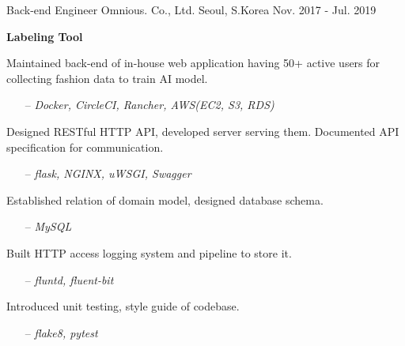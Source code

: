 

\begin{cventries}

  \cventry
    {Back-end Engineer} %
    {Omnious. Co., Ltd.} %
    {Seoul, S.Korea} %
    {Nov. 2017 - Jul. 2019} %
    {
      \begin{cvitems} %
        \item[] {\textbf{Labeling Tool}}
        \item {Maintained back-end of in-house web application having 50+ active users for collecting fashion data to train AI model.}
        \begin{itemize}
          \item[--] \textit{Docker, CircleCI, Rancher, AWS(EC2, S3, RDS)}
        \end{itemize}
        \item {Designed RESTful HTTP API, developed server serving them. Documented API specification for communication.}
        \begin{itemize}
          \item[--] \textit{flask, NGINX, uWSGI, Swagger}
        \end{itemize}
        \item {Established relation of domain model, designed database schema.}
        \begin{itemize}
          \item[--] \textit{MySQL}
        \end{itemize}
        \item {Built HTTP access logging system and pipeline to store it.}
        \begin{itemize}
          \item[--] \textit{fluntd, fluent-bit}
        \end{itemize}
        \item {Introduced unit testing, style guide of codebase.}
        \begin{itemize}
          \item[--] \textit{flake8, pytest}

\end{itemize}
\end{cvitems}}
\end{cventries}
